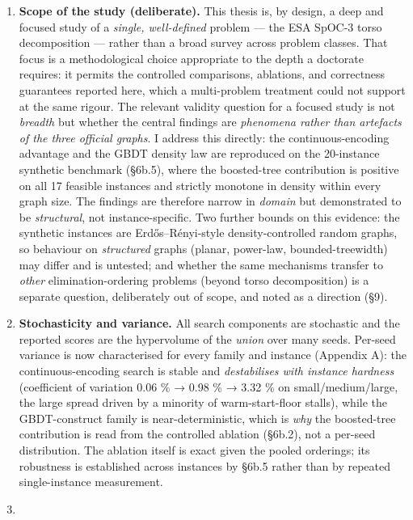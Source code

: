 \documentclass[
  11pt,
]{article}
\providecommand{\tightlist}{%
  \setlength{\itemsep}{0pt}\setlength{\parskip}{0pt}}
\begin{document}
\begin{enumerate}
\def\labelenumi{\arabic{enumi}.}
\tightlist
\item
  \textbf{Scope of the study (deliberate).} This thesis is, by design, a
  deep and focused study of a \emph{single, well-defined} problem ---
  the ESA SpOC-3 torso decomposition --- rather than a broad survey
  across problem classes. That focus is a methodological choice
  appropriate to the depth a doctorate requires: it permits the
  controlled comparisons, ablations, and correctness guarantees reported
  here, which a multi-problem treatment could not support at the same
  rigour. The relevant validity question for a focused study is not
  \emph{breadth} but whether the central findings are \emph{phenomena
  rather than artefacts of the three official graphs}. I address this
  directly: the continuous-encoding advantage and the GBDT density law
  are reproduced on the 20-instance synthetic benchmark (§6b.5), where
  the boosted-tree contribution is positive on all 17 feasible instances
  and strictly monotone in density within every graph size. The findings
  are therefore narrow in \emph{domain} but demonstrated to be
  \emph{structural}, not instance-specific. Two further bounds on this
  evidence: the synthetic instances are Erdős--Rényi-style
  density-controlled random graphs, so behaviour on \emph{structured}
  graphs (planar, power-law, bounded-treewidth) may differ and is
  untested; and whether the same mechanisms transfer to \emph{other}
  elimination-ordering problems (beyond torso decomposition) is a
  separate question, deliberately out of scope, and noted as a direction
  (§9).
\item
  \textbf{Stochasticity and variance.} All search components are
  stochastic and the reported scores are the hypervolume of the
  \emph{union} over many seeds. Per-seed variance is now characterised
  for every family and instance (Appendix A): the continuous-encoding
  search is stable and \emph{destabilises with instance hardness}
  (coefficient of variation 0.06 \% → 0.98 \% → 3.32 \% on
  small/medium/large, the large spread driven by a minority of
  warm-start-floor stalls), while the GBDT-construct family is
  near-deterministic, which is \emph{why} the boosted-tree contribution
  is read from the controlled ablation (§6b.2), not a per-seed
  distribution. The ablation itself is exact given the pooled orderings;
  its robustness is established across instances by §6b.5 rather than by
  repeated single-instance measurement.
\item

\end{enumerate}
\end{document}
